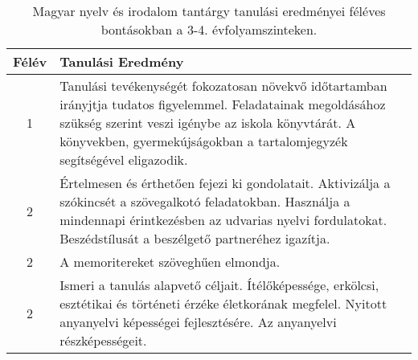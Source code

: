        
           \begin{longtable}{c | p{12cm} }
            \caption[Magyar nyelv és irodalom 3-4.]{Magyar nyelv és irodalom tantárgy tanulási eredményei féléves bontásokban a 3-4. évfolyamszinteken. }  \\

            \textbf{Félév} & \textbf{Tanulási Eredmény} \\
            \hline
            \endhead
                                
                                      
                                
                                          1 &  Tanulási tevékenységét fokozatosan növekvő időtartamban irányjtja tudatos figyelemmel. Feladatainak megoldásához szükség szerint veszi igénybe az iskola könyvtárát. A könyvekben, gyermekújságokban a tartalomjegyzék segítségével eligazodik. \\ \hline
                                      
                                
                                          2 &  Értelmesen és érthetően fejezi ki gondolatait. Aktivizálja a szókincsét a szövegalkotó feladatokban. Használja a mindennapi érintkezésben az udvarias nyelvi fordulatokat. Beszédstílusát a beszélgető partneréhez igazítja. \\ \hline
                                          2 &  A memoritereket szöveghűen elmondja. \\ \hline
                                          2 &  Ismeri a tanulás alapvető céljait. Ítélőképessége, erkölcsi, esztétikai és történeti érzéke életkorának megfelel. Nyitott anyanyelvi képességei fejlesztésére. Az anyanyelvi részképességeit. \\ \hline
                                      
                                
                                      

\end{longtable}
